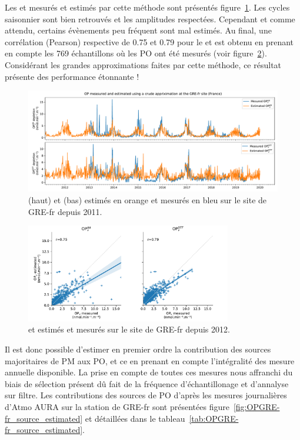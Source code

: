 Les \POAAv{} et \PODTTv{} mesurés et estimés par cette méthode sont présentés
figure~\ref{fig:OPGRE-fr-estimated}.  Les cycles saisonnier sont bien retrouvés et les
amplitudes respectées. Cependant et comme attendu, certains évènements peu fréquent sont
mal estimés. Au final, une corrélation (Pearson) respective de 0.75 et 0.79 pour le
\POAAv{} et \PODTTv{} est obtenu en prenant en compte les 769 échantillons où les PO ont
été mesurés (voir figure~\ref{fig:OPGRE-fr-estimated_scatter}).  Considérant les grandes
approximations faites par cette méthode, ce résultat présente des performance étonnante !

\begin{figure}[ht]
    \centering
    \includegraphics[width=1.0\textwidth]{figures/chapter05/OPGRE-fr_estimated.pdf}
    \caption{\POAAv{} (haut) et \PODTTv{} (bas) estimés en orange et mesurés en bleu sur le site de GRE-fr depuis 2011.}
    \label{fig:OPGRE-fr-estimated}
\end{figure}
 
\begin{figure}[ht]
    \centering
    \includegraphics[width=0.8\textwidth]{figures/chapter05/OPGRE-fr_estimated_scatter.pdf}
    \caption{\POAAv{} et \PODTTv{} estimés et mesurés sur le site de GRE-fr depuis 2012.}
    \label{fig:OPGRE-fr-estimated_scatter}
\end{figure}


Il est donc possible d'estimer en premier ordre la contribution des sources majoritaires de
PM aux PO, et ce en prenant en compte l'intégralité des mesure annuelle disponible. La
prise en compte de toutes ces mesures nous affranchi du biais de sélection présent dû
fait de la fréquence d'échantillonage et d'annalyse sur filtre. Les contributions des
sources de PO d'après les mesures journalières d'Atmo AURA sur la station de GRE-fr sont
présentées figure~\ref{fig:OPGRE-fr_source_estimated} et détaillées dans le
tableau~\ref{tab:OPGRE-fr_source_estimated}.


